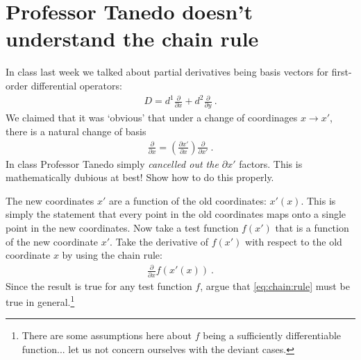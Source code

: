 \documentclass[12pt]{article}
\numberwithin{equation}{section}    %
\begin{document}
\section{Professor Tanedo doesn't understand the chain rule}

In class last week we talked about partial derivatives being basis vectors for first-order differential operators:
\begin{align}
	D = d^1 \frac{\partial}{\partial x} + d^2 \frac{\partial}{\partial y} \ .
\end{align}
We claimed that it was `obvious' that under a change of coordinages $x\to x'$, there is a natural change of basis
\begin{align}
	\frac{\partial}{\partial x} = \left(\frac{\partial x'}{\partial x}\right) \frac{\partial}{\partial x'} \ . \label{eq:chain:rule}
\end{align}
In class Professor Tanedo simply \emph{cancelled out the $\partial x'$} factors. This is mathematically dubious at best! Show how to do this properly.

The new coordinates $x'$ are a function of the old coordinates: $x'(x)$. This is simply the statement that every point in the old coordinates maps onto a single point in the new coordinates. Now take a test function $f(x')$ that is a function of the new coordinate $x'$. Take the derivative of $f(x')$ with respect to the old coordinate $x$ by using the chain rule:
\begin{align}
	\frac{\partial}{\partial x} f\left(x'(x)\right) \ .
\end{align}
Since the result is true for any test function $f$, argue that \eqref{eq:chain:rule} must be true in general.\footnote{There are some assumptions here about $f$ being a sufficiently differentiable function... let us not concern ourselves with the deviant cases.}






\end{document}
